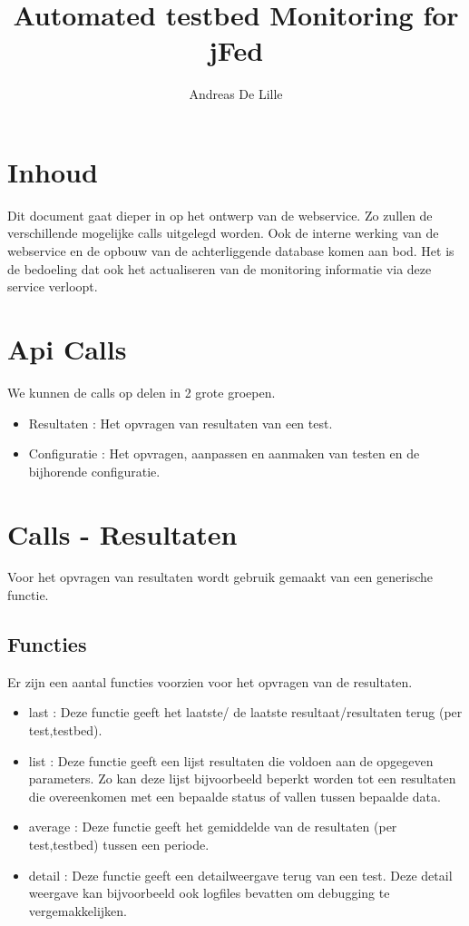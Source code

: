 \documentclass[11pt]{article}
\begin{document}
\title{Automated testbed Monitoring for jFed}
\author{Andreas De Lille}
\maketitle

\section{Inhoud}
Dit document gaat dieper in op het ontwerp van de webservice.
Zo zullen de verschillende mogelijke calls uitgelegd worden. Ook de interne werking van de webservice en de opbouw van de achterliggende database komen aan bod.
Het is de bedoeling dat ook het actualiseren van de monitoring informatie via deze service verloopt.

\section{Api Calls}
We kunnen de calls op delen in 2 grote groepen. 
\begin{itemize}
\item Resultaten : Het opvragen van resultaten van een test.
\item Configuratie : Het opvragen, aanpassen en aanmaken van testen en de bijhorende configuratie.
\end{itemize}

\section{Calls - Resultaten}
Voor het opvragen van resultaten wordt gebruik gemaakt van een generische functie.

\subsection{Functies}
Er zijn een aantal functies voorzien voor het opvragen van de resultaten.
\begin{itemize}
\item last : Deze functie geeft het laatste/ de laatste resultaat/resultaten terug (per test,testbed).
\item list : Deze functie geeft een lijst resultaten die voldoen aan de opgegeven parameters. 
Zo kan deze lijst bijvoorbeeld beperkt worden tot een resultaten die overeenkomen met een bepaalde status of vallen tussen bepaalde data.
\item average : Deze functie geeft het gemiddelde van de resultaten (per test,testbed) tussen een periode.
\item detail : Deze functie geeft een detailweergave terug van een test. Deze detail weergave kan bijvoorbeeld ook logfiles bevatten om debugging te vergemakkelijken.
\end{itemize}
\end{document}
